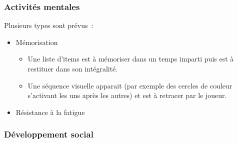 \documentclass[a4paper,12pt,francais]{article}
\begin{document}
\subsubsection{Activités mentales}
Plusieurs types sont prévus~:
\begin{itemize}
	\item Mémorisation
		\begin{itemize}
			\item Une liste d’items est à mémoriser dans un temps imparti puis est à restituer dans son intégralité.
			\item Une séquence visuelle apparait (par exemple des cercles de couleur s'activant les uns après les autres) et est à retracer par le joueur.
		\end{itemize}
	\item Résistance à la fatigue
\end{itemize}
\subsubsection{Développement social}
\end{document}
